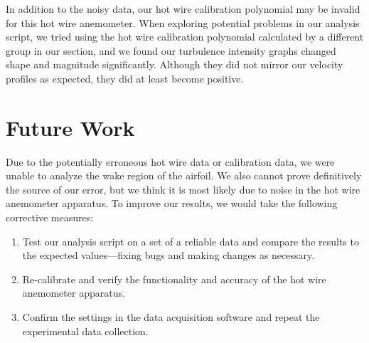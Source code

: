 In addition to the noisy data, our hot wire calibration polynomial may be invalid for this hot wire anemometer. When exploring potential problems in our analysis script, we tried using the hot wire calibration polynomial calculated by a different group in our section, and we found our turbulence intensity graphs changed shape and magnitude significantly. Although they did not mirror our velocity profiles as expected, they did at least become positive.

\section{Future Work}

Due to the potentially erroneous hot wire data or calibration data, we were unable to analyze the wake region of the airfoil. We also cannot prove definitively the source of our error, but we think it is most likely due to noise in the hot wire anemometer apparatus. To improve our results, we would take the following corrective measures:

\begin{enumerate}
    \item Test our analysis script on a set of a reliable data and compare the results to the expected values—fixing bugs and making changes as necessary.
    \item Re-calibrate and verify the functionality and accuracy of the hot wire anemometer apparatus.
    \item Confirm the settings in the data acquisition software and repeat the experimental data collection.
\end{enumerate}
